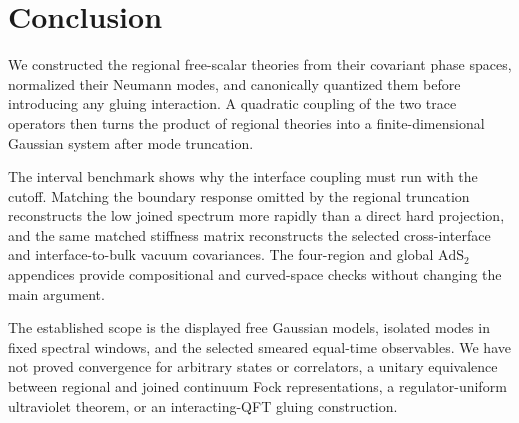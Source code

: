 \section{Conclusion}\label{sec:conclusion}

We constructed the regional free-scalar theories from their covariant phase spaces, normalized their Neumann modes, and canonically quantized them before introducing any gluing interaction. A quadratic coupling of the two trace operators then turns the product of regional theories into a finite-dimensional Gaussian system after mode truncation.

The interval benchmark shows why the interface coupling must run with the cutoff. Matching the boundary response omitted by the regional truncation reconstructs the low joined spectrum more rapidly than a direct hard projection, and the same matched stiffness matrix reconstructs the selected cross-interface and interface-to-bulk vacuum covariances. The four-region and global $\mathrm{AdS}_2$ appendices provide compositional and curved-space checks without changing the main argument.

The established scope is the displayed free Gaussian models, isolated modes in fixed spectral windows, and the selected smeared equal-time observables. We have not proved convergence for arbitrary states or correlators, a unitary equivalence between regional and joined continuum Fock representations, a regulator-uniform ultraviolet theorem, or an interacting-QFT gluing construction.
